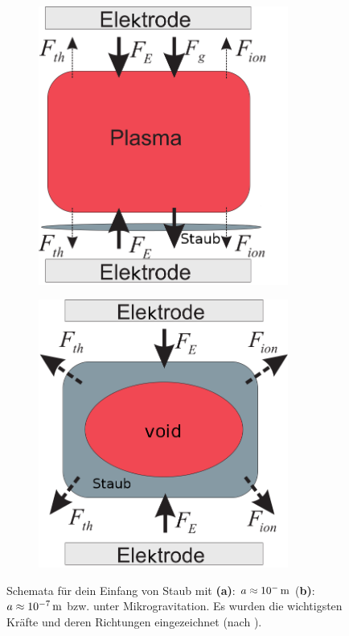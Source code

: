 \documentclass[numbers=noenddot,a4paper,notitlepage,twoside,BCOR15mm]{scrbook}
\newcommand{\tenpo}[1]{ 10^{#1}}
\newcommand{\fett}[1]{\textbf{#1}}
\begin{document}
				\begin{figure}[!t]
					\centering
					\begin{subfigure}[b]{0.45\textwidth}
						\includegraphics[width=0.9\textwidth,height=0.9\textwidth]{figs/directionsofforcesandtrappingmelzerlinks.png}
						\caption{}
						\label{img:linksdirection}
					\end{subfigure}
					\begin{subfigure}[b]{0.45\textwidth}
						\includegraphics[width=0.9\textwidth,height=0.9\textwidth]{figs/directionsofforcesandtrappingmelzerrechts.png}
						\caption{}
						\label{img:rechtsdirection}
					\end{subfigure}
					\caption{Schemata für dein Einfang von Staub mit \fett{(a)}: $a\approx\unit[\tenpo{-}]{m}$ (\fett{b)}: $a\approx\unit[\tenpo{-7}]{m}$ bzw. unter Mikrogravitation. Es wurden die wichtigsten Kräfte und deren Richtungen eingezeichnet (nach \cite{Melzer12}).}
					\label{img:kräfterichtungen}
				\end{figure}
\end{document}
